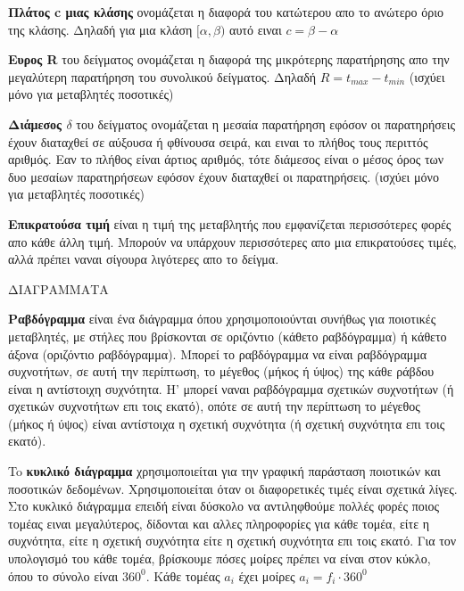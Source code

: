 \documentclass[a4paper,12pt]{article}                      %
\begin{document}
\begin{multicols}{2}
\textbf{Πλάτος c μιας κλάσης} ονομάζεται η διαφορά του κατώτερου απο το ανώτερο όριο της κλάσης. Δηλαδή για μια κλάση $[\alpha,\beta) $ αυτό ειναι $ c=\beta-\alpha $

\textbf{Ευρος R} του δείγματος ονομάζεται η διαφορά της μικρότερης παρατήρησης απο την μεγαλύτερη παρατήρηση του συνολικού δείγματος. Δηλαδή $ R = t_{max}-t_{min} $ (ισχύει μόνο για μεταβλητές ποσοτικές)

\textbf{Διάμεσος $\delta$} του δείγματος ονομάζεται η μεσαία παρατήρηση εφόσον οι παρατηρήσεις έχουν διαταχθεί σε αύξουσα ή φθίνουσα σειρά, και ειναι το πλήθος τους περιττός αριθμός. Εαν το πλήθος είναι άρτιος αριθμός, τότε διάμεσος είναι ο μέσος όρος των δυο μεσαίων παρατηρήσεων εφόσον έχουν διαταχθεί οι παρατηρήσεις. (ισχύει μόνο για μεταβλητές ποσοτικές)

\textbf{Επικρατούσα τιμή} είναι η τιμή της μεταβλητής που εμφανίζεται περισσότερες φορές απο κάθε άλλη τιμή. Μπορούν να υπάρχουν περισσότερες απο μια επικρατούσες τιμές, αλλά πρέπει ναναι σίγουρα λιγότερες απο το δείγμα.

ΔΙΑΓΡΑΜΜΑΤΑ

\textbf{Ραβδόγραμμα} είναι ένα διάγραμμα όπου χρησιμοποιούνται συνήθως για ποιοτικές μεταβλητές, με στήλες που βρίσκονται σε οριζόντιο (κάθετο ραβδόγραμμα) ή κάθετο άξονα (οριζόντιο ραβδόγραμμα). Μπορεί το ραβδόγραμμα να είναι ραβδόγραμμα συχνοτήτων, σε αυτή την περίπτωση, το μέγεθος (μήκος ή ύψος) της κάθε ράβδου είναι η αντίστοιχη συχνότητα. Η' μπορεί ναναι ραβδόγραμμα σχετικών συχνοτήτων (ή σχετικών συχνοτήτων επι τοις εκατό), οπότε σε αυτή την περίπτωση το μέγεθος (μήκος ή ύψος) είναι αντίστοιχα η σχετική συχνότητα (ή σχετική συχνότητα επι τοις εκατό).

To \textbf{κυκλικό διάγραμμα} χρησιμοποιείται για την γραφική παράσταση ποιοτικών και ποσοτικών δεδομένων. Χρησιμοποιείται όταν οι διαφορετικές τιμές είναι σχετικά λίγες. Στο κυκλικό διάγραμμα επειδή είναι δύσκολο να αντιληφθούμε πολλές φορές ποιος τομέας ειναι μεγαλύτερος, δίδονται και αλλες πληροφορίες για κάθε τομέα, είτε η συχνότητα, είτε η σχετική συχνότητα είτε η σχετική συχνότητα επι τοις εκατό. Για τον υπολογισμό του κάθε τομέα, βρίσκουμε πόσες μοίρες πρέπει να είναι στον κύκλο, όπου το σύνολο είναι $ 360^0 $. Κάθε τομέας $ a_i $ έχει μοίρες $ a_i = f_i \cdot 360^0 $



\end{multicols}
\newpage
\end{document}
